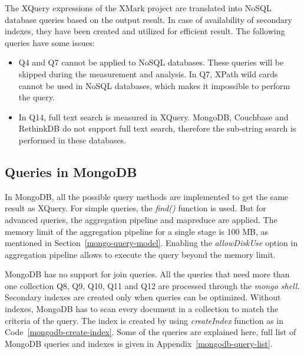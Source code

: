 The XQuery expressions of the XMark project are translated into NoSQL database queries based on the output result. In case of availability of secondary indexes, they have been created and utilized for efficient result.
 The following queries have some issues:
\begin{itemize}
\item Q4 and Q7 cannot be applied to NoSQL databases. These queries will be skipped during the measurement and analysis. In Q7, XPath  wild cards cannot be used in NoSQL databases, which makes it impossible to perform the query.

\item In Q14, full text search is measured in XQuery. MongoDB, Couchbase and RethinkDB do not support full text search, therefore the sub-string search is performed in these databases. 
\end{itemize}

\subsection{Queries in MongoDB}

In MongoDB, all the possible query methods are implemented to get the same result as XQuery. For simple queries, the \textit{find()} function is used. But for advanced queries, the aggregation pipeline and mapreduce are applied. The memory limit of the aggregation pipeline for a single stage is 100 MB, as mentioned in Section~\ref{mongo-query-model}. Enabling the \textit{allowDiskUse} option in aggregation pipeline allows to execute the query beyond the memory limit.

MongoDB has no support for join queries. All the queries that need more than one collection  Q8, Q9, Q10, Q11 and Q12  are processed through the \textit{mongo shell}. Secondary indexes are created only when queries can be optimized. Without indexes, MongoDB has to scan every document in a collection to match the criteria of the query. The index is created by using \textit{createIndex} function as in Code~\ref{mongodb-create-index}. Some of the queries are explained here, full list of MongoDB queries and indexes is given in Appendix~\ref{mongodb-query-list}.

